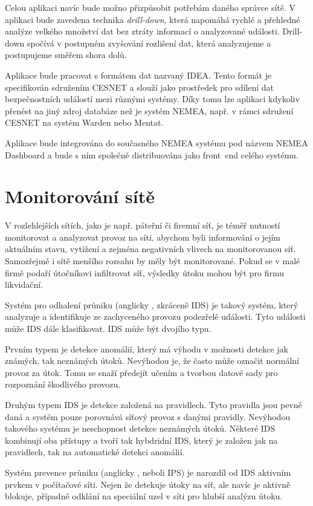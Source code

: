 Celou aplikaci navíc bude možno přizpůsobit potřebám daného správce sítě. V aplikaci bude zavedena technika {\it drill-down}, která napomáhá rychlé a přehledné analýze velkého množství dat bez ztráty informací o analyzované události. Drill-down spočívá v postupném zvyšování rozlišení dat, která analyzujeme a postupujeme směřem shora dolů.

Aplikace bude pracovat s formátem dat nazvaný IDEA. Tento formát je specifikován sdružením CESNET a slouží jako prostředek pro sdílení dat bezpečnostních událostí mezi různými systémy. Díky tomu lze aplikaci kdykoliv přenést na jiný zdroj databáze než je systém NEMEA, např. v rámci sdružení CESNET na systém Warden nebo Mentat.

Aplikace bude integrována do současného NEMEA systému pod názvem NEMEA Dashboard a bude s ním společně distribuována jako front~end celého systému.

\chapter{Monitorování sítě}

V rozlehlejších sítích, jako je např. páteřní či firemní síť, je téměř nutností monitorovat a analyzovat provoz na síti, abychom byli informování o jejím aktuálním stavu, vytížení a zejména negativních vlivech na monitorovanou síť. Samozřejmě i sítě menšího rozsahu by měly být monitorované. Pokud se v malé firmě podaří útočníkovi infiltrovat síť, výsledky útoku mohou být pro firmu likvidační.

Systém pro odhalení průniku (anglicky , zkráceně IDS)\cite{idsips} je takový systém, který analyzuje a identifikuje ze zachyceného provozu podezřelé události. Tyto události může IDS dále klasifikovat. IDS může být dvojího typu. 

Prvním typem je detekce anomálií, který má výhodu v možnosti detekce jak známých, tak neznámých útoků. Nevýhodou je, že často může označit normální provoz za útok. Tomu se snaží předejít učením a tvorbou datové sady pro rozpoznání škodlivého provozu.

Druhým typem IDS je detekce založená na pravidlech. Tyto pravidla jsou pevně daná a systém pouze porovnává síťový provoz s danými pravidly. Nevýhodou takového systému je neschopnost detekce neznámých útoků. Některé IDS kombinují oba přístupy a tvoří tak hybdridní IDS, který je založen jak na pravidlech, tak na automatické detekci anomálií.

Systém prevence průniku (anglicky , neboli IPS)\cite{idsips} je narozdíl od IDS aktivním prvkem v počítačové síti. Nejen že detekuje útoky na síť, ale navíc je aktivně blokuje, případně odklání na speciální uzel v síti pro hlubší analýzu útoku.

